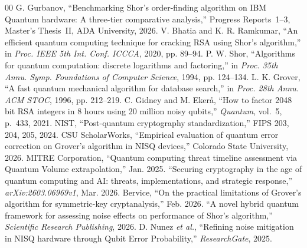\documentclass[conference]{IEEEtran}
\begin{document}
\begin{thebibliography}{00}
 G. Gurbanov, ``Benchmarking Shor's order-finding algorithm on IBM Quantum hardware: A three-tier comparative analysis,'' Progress Reports~1--3, Master's Thesis~II, ADA University, 2026.
 V. Bhatia and K. R. Ramkumar, ``An efficient quantum computing technique for cracking RSA using Shor's algorithm,'' in \textit{Proc. IEEE 5th Int. Conf. ICCCA}, 2020, pp. 89--94.
 P. W. Shor, ``Algorithms for quantum computation: discrete logarithms and factoring,'' in \textit{Proc. 35th Annu. Symp. Foundations of Computer Science}, 1994, pp. 124--134.
 L. K. Grover, ``A fast quantum mechanical algorithm for database search,'' in \textit{Proc. 28th Annu. ACM STOC}, 1996, pp. 212--219.
 C. Gidney and M. Eker\aa, ``How to factor 2048 bit RSA integers in 8 hours using 20 million noisy qubits,'' \textit{Quantum}, vol.~5, p.~433, 2021.
 NIST, ``Post-quantum cryptography standardization,'' FIPS 203, 204, 205, 2024.
 CSU ScholarWorks, ``Empirical evaluation of quantum error correction on Grover's algorithm in NISQ devices,'' Colorado State University, 2026.
 MITRE Corporation, ``Quantum computing threat timeline assessment via Quantum Volume extrapolation,'' Jan. 2025.
 ``Securing cryptography in the age of quantum computing and AI: threats, implementations, and strategic response,'' \textit{arXiv:2603.06969v1}, Mar. 2026.
 Bervice, ``On the practical limitations of Grover's algorithm for symmetric-key cryptanalysis,'' Feb. 2026.
 ``A novel hybrid quantum framework for assessing noise effects on performance of Shor's algorithm,'' \textit{Scientific Research Publishing}, 2026.
 D. Nunez \textit{et al.}, ``Refining noise mitigation in NISQ hardware through Qubit Error Probability,'' \textit{ResearchGate}, 2025.
\end{thebibliography}
\end{document}
